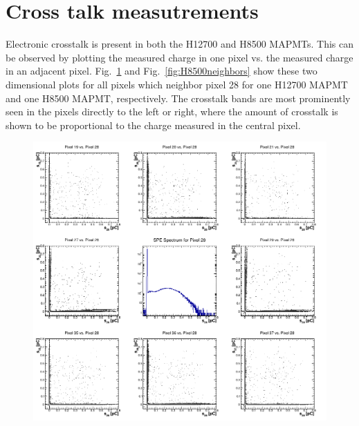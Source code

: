 \section{Cross talk measutrements}

Electronic crosstalk is present in both the H12700 and H8500 MAPMTs. This can be observed by plotting the measured charge in one pixel vs. the measured charge in an adjacent pixel. Fig.~\ref{fig:H12700neighbors} and Fig.~\ref{fig:H8500neighbors} show these two dimensional plots for all pixels which neighbor pixel 28 for one H12700 MAPMT and one H8500 MAPMT, respectively. The crosstalk bands are most prominently seen in the pixels directly to the left or right, where the amount of crosstalk is shown to be proportional to the charge measured in the central pixel. 


\begin{figure}
	\centering
	\includegraphics[width=0.95\linewidth]{figures/GA0982_neighbors_crosstalk.png}
	\caption{}
	\label{fig:H12700neighbors}
\end{figure}
